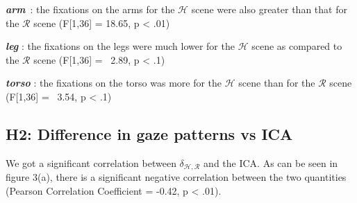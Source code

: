 \documentclass[a4,twocolumn,10pt]{article}
\begin{document}
\textit{\textbf{arm}}\ : the fixations on the arms for the $\mathcal{H}$ scene
were also greater than that for the $\mathcal{R}$ scene (F[1,36] = 18.65, p <
.01)

\textit{\textbf{leg}}\hspace{0.18cm} : the fixations on the legs were much lower
for the $\mathcal{H}$ scene as compared to the $\mathcal{R}$ scene (F[1,36] = \
2.89, p < .1)

\textit{\textbf{torso}} : the fixations on the torso was more for the
$\mathcal{H}$ scene than for the $\mathcal{R}$ scene (F[1,36] = \ 3.54, p < .1) 

\subsection{H2: Difference in gaze patterns vs ICA}

We got a significant correlation between $\delta_{\mathcal{H},\mathcal{R}}$ and
the ICA. As can be seen in figure 3(a), there is a significant negative
correlation between the two quantities (Pearson Correlation Coefficient = -0.42,
p < .01).
\end{document}
